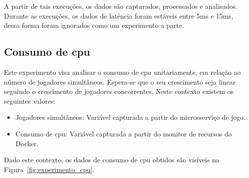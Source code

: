 A partir de tais execuções, os dados são capturados, processados e analisados.
%
Durante as execuções, os dados de latência foram estáveis entre 5ms e 15ms, dessa forma foram ignorados como um experimento a parte.



\subsection{Consumo de \ac{cpu}}



Este experimento visa analisar o consumo de \ac{cpu} unitariamente, em relação ao número de jogadores simultâneos.
%
Espera-se que o seu crescimento seja linear seguindo o crescimento de jogadores concorrentes.
%
Neste contexto existem os seguintes valores:



\begin{itemize}
    \item Jogadores simultâneos: Variável capturada a partir do microsserviço de jogo.
    \item Consumo de \ac{cpu}: Variável capturada a partir do monitor de recursos do Docker.
\end{itemize}

Dado este contexto, os dados de consumo de \ac{cpu} obtidos são visíveis na Figura~\ref{fig:experimento_cpu}.



